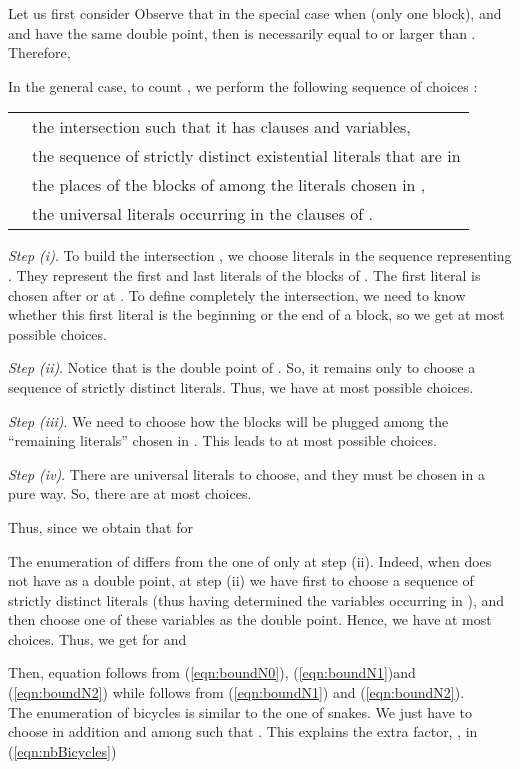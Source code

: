 \documentclass[aop,noinfoline]{imsart}
\renewcommand{\Box}{{\vrule width0.6ex height1em depth0cm}}
\newenvironment{proof}{\noindent{\bf Proof:}}{\hfill \Box}
\begin{document}
\begin{proof}
Let us  first consider 
Observe that in the special case when  (only one block), and  and  have the same double point, then  is necessarily equal to or larger than . Therefore,  
 
In the general case, to count , we
perform the following sequence of choices :

\begin{tabular}{ll}
&  the intersection  such that it has  clauses and  variables,\\
& the sequence of strictly distinct existential literals that are  in \\
&  the places of the  blocks of  among the literals chosen in ,\\
&  the universal literals occurring in  the clauses of .
\end{tabular}

\emph{Step (i)}. To build the intersection , we choose 
literals  in the sequence representing  . They represent the first and last literals of the
 blocks of . The first literal is chosen after or at . 
To
define completely the intersection, we need to know whether this first
literal is the beginning or the end of a block, so we get
at most  possible choices.

\emph{Step (ii)}. Notice that    is the double point of . So, it remains only to choose a sequence of   strictly distinct literals.
Thus,
we have at most  possible choices.

\emph{Step (iii)}.
 We need to choose how the   blocks will be plugged among the ``remaining literals''  chosen in
. 
This
leads to at most  possible choices.

\emph{Step (iv)}. There are  universal literals to choose, and they must be chosen in
a pure way. So, there are at most  choices.

Thus, since    we obtain that   for 

The enumeration of  differs from the one of  only at step (ii). Indeed, when  does not have  as a double point, at step (ii) we have first to choose  a sequence of   strictly distinct literals (thus having  determined the  variables occurring in ), and then choose one of these    variables as the double point. Hence, we have at most  choices.
Thus, we get  for   and 

Then, equation   follows from (\ref{eqn:boundN0}), (\ref{eqn:boundN1})and  (\ref{eqn:boundN2}) while    follows from (\ref{eqn:boundN1}) and (\ref{eqn:boundN2}).\\
 
 The enumeration of bicycles is similar to the one of snakes. We just have to choose in addition  and  among  such that   . This explains  the  extra factor, , in (\ref{eqn:nbBicycles})

\end{proof}
\end{document}
